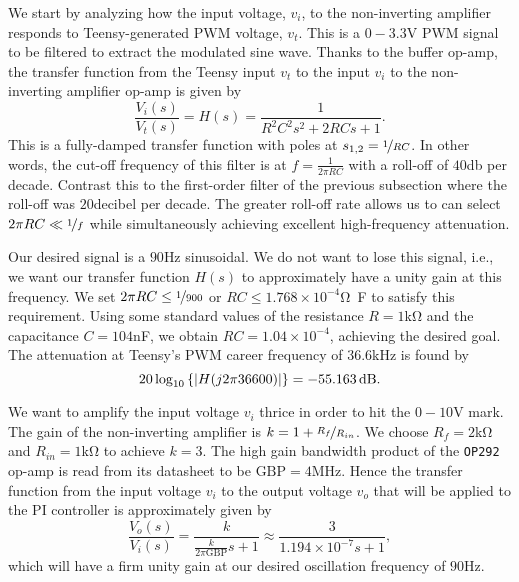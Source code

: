 We start by analyzing how the input voltage, $v_i$, to the non-inverting
amplifier responds to Teensy-generated PWM voltage, $v_t$. This is a
$0-3.3$\unit{\volt} PWM signal to be filtered to extract the modulated sine
wave. Thanks to the buffer op-amp, the transfer function from the Teensy input
$v_t$ to the input $v_i$ to the non-inverting amplifier op-amp is given by \[
\frac{V_i(s)}{V_t(s)} = H(s) = \frac{1}{R^2C^2s^2+2RCs+1}.\]
%
This is a fully-damped transfer function with poles at $s_{1,2} =
\nicefrac{1}{RC}$. In other words, the cut-off frequency of this filter is at $f
= \frac{1}{2\pi RC}$ with a roll-off of $40$\unit{\decibel} per decade. Contrast
this to the first-order filter of the previous subsection where the roll-off was
$20$\unit{decibel} per decade. The greater roll-off rate allows us to can select
$2\pi RC \ll \nicefrac{1}{f}$ while simultaneously achieving excellent
high-frequency attenuation.

Our desired signal is a $90$\unit{\hertz} sinusoidal. We do not want to lose
this signal, i.e., we want our transfer function $H(s)$ to approximately have a
unity gain at this frequency. We set $2\pi RC \leq \nicefrac{1}{900}$ or $RC
\leq 1.768 \times 10^{-4}$\unit{\ohm\farad} to satisfy this requirement. Using
some standard values of the resistance $R = 1$\unit{\kilo\ohm} and the
capacitance $C = 104$\unit{\nano\farad}, we obtain $RC = 1.04 \times 10^{-4}$,
achieving the desired goal. The attenuation at Teensy's PWM career frequency of
$36.6$\unit{\kilo\hertz} is found by \[ 20 \log_{10}\left\{\abs{H(j 2\pi
36600)}\right\} = -55.163\,\unit{\decibel}. \]

We want to amplify the input voltage $v_i$ thrice in order to hit the
$0-10$\unit{\volt} mark. The gain of the non-inverting amplifier is $k = 1 +
\nicefrac{R_f}{R_{in}}$. We choose $R_f = 2$\unit{\kilo\ohm} and $R_{in} =
1$\unit{\kilo\ohm} to achieve $k = 3$. The high gain bandwidth product of the
\texttt{OP292} op-amp is read from its datasheet to be $\text{GBP} =
4$\unit{\mega\hertz}. Hence the transfer function from the input voltage $v_i$
to the output voltage $v_o$ that will be applied to the PI controller is
approximately given by \[ \frac{V_o(s)}{V_i(s)} =
\frac{k}{\frac{k}{2\pi\text{GBP}}s + 1} \approx \frac{3}{1.194\times 10^{-7}s +
1}, \] which will have a firm unity gain at our desired oscillation frequency of
$90$\unit{\hertz}.
